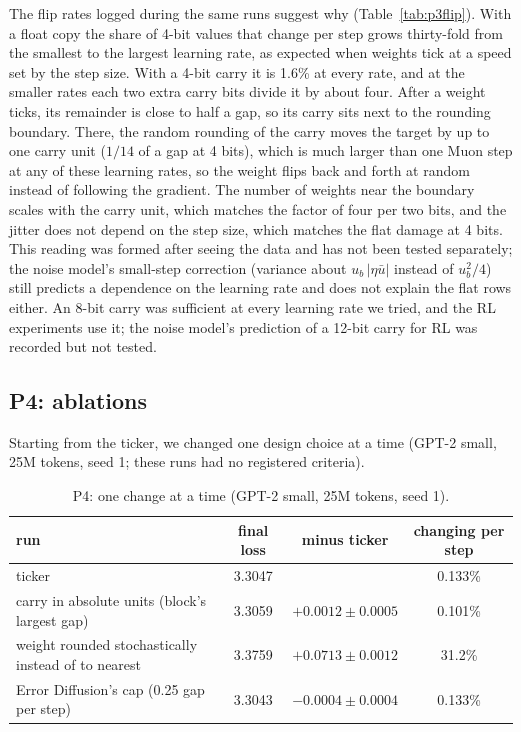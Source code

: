 \documentclass[11pt]{article}
\begin{document}
The flip rates logged during the same runs suggest why (Table~\ref{tab:p3flip}). With a float copy the share of
4-bit values that change per step grows thirty-fold from the smallest to the largest learning rate, as expected when
weights tick at a speed set by the step size. With a 4-bit carry it is 1.6\% at every rate, and at the smaller rates each two
extra carry bits divide it by about four. After a weight ticks, its remainder is close to half a gap, so its carry sits next to
the rounding boundary. There, the random rounding of the carry moves the target by up to one carry unit ($1/14$ of a
gap at 4 bits), which is much larger than one Muon step at any of these learning rates, so the weight flips back and
forth at random instead of following the gradient. The number of weights near the boundary scales with the carry unit,
which matches the factor of four per two bits, and the jitter does not depend on the step size, which matches the flat
damage at 4 bits. This reading was formed after seeing the data and has not been tested separately; the noise model's
small-step correction (variance about $u_b\,|\eta\bar u|$ instead of $u_b^2/4$) still predicts a dependence on the
learning rate and does not explain the flat rows either. An 8-bit carry was sufficient at every learning rate we
tried, and the RL experiments use it; the noise model's prediction of a 12-bit carry for RL was recorded but not
tested.

\subsection{P4: ablations}\label{sec:p4}
Starting from the ticker, we changed one design choice at a time (GPT-2 small, 25M tokens, seed 1; these runs had no
registered criteria).

\begin{table}[t]
\centering
\caption{P4: one change at a time (GPT-2 small, 25M tokens, seed 1).}
\label{tab:p4}
\small
\begin{tabular}{lccc}
\toprule
run & final loss & minus ticker & changing per step \\
\midrule
ticker & 3.3047 & & 0.133\% \\
carry in absolute units (block's largest gap) & 3.3059 & $+0.0012 \pm 0.0005$ & 0.101\% \\
weight rounded stochastically instead of to nearest & 3.3759 & $+0.0713 \pm 0.0012$ & 31.2\% \\
Error Diffusion's cap (0.25 gap per step) & 3.3043 & $-0.0004 \pm 0.0004$ & 0.133\% \\
\bottomrule
\end{tabular}
\end{table}
\end{document}

